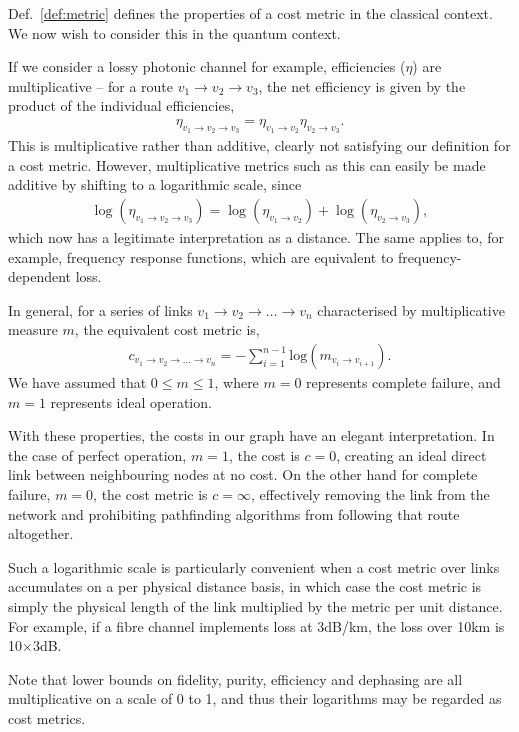 \documentclass[aps, rmp, twocolumn, amsmath, amssymb, nofootinbib, superscriptaddress, longbibliography, floatfix, table-of-contents, eqsecnum]{revtex4-1}
\begin{document}
Def.~\ref{def:metric} defines the properties of a cost metric in the classical context. We now wish to consider this in the quantum context.

If we consider a lossy photonic channel for example, efficiencies ($\eta$) are multiplicative -- for a route \mbox{$v_1\to v_2\to v_3$}, the net efficiency is given by the product of the individual efficiencies, \begin{align}
\eta_{v_1\to v_2 \to v_3} = \eta_{v_1\to v_2} \eta_{v_2\to v_3}.
\end{align}
This is multiplicative rather than additive, clearly not satisfying our definition for a cost metric. However, multiplicative metrics such as this can easily be made additive by shifting to a logarithmic scale, since
\begin{align}
\log(\eta_{v_1\to v_2\to v_3}) = \log(\eta_{v_1\to v_2}) + \log(\eta_{v_2\to v_3}),
\end{align}
which now has a legitimate interpretation as a distance. The same applies to, for example, frequency response functions, which are equivalent to frequency-dependent loss.

In general, for a series of links \mbox{$v_1\to v_2 \to \dots \to v_n$} characterised by multiplicative measure $m$, the equivalent cost metric is,
\begin{align} \label{eq:dist_log}
c_{v_1\to v_2 \to \dots \to v_n} = -\sum_{i=1}^{n-1} \text{log}(m_{v_i\to v_{i+1}}).
\end{align}
We have assumed that \mbox{$0\leq m \leq 1$}, where \mbox{$m=0$} represents complete failure, and \mbox{$m=1$} represents ideal operation.

With these properties, the costs in our graph have an elegant interpretation. In the case of perfect operation, \mbox{$m=1$}, the cost is \mbox{$c=0$}, creating an ideal direct link between neighbouring nodes at no cost. On the other hand for complete failure, \mbox{$m=0$}, the cost metric is \mbox{$c=\infty$}, effectively removing the link from the network and prohibiting pathfinding algorithms from following that route altogether.

Such a logarithmic scale is particularly convenient when a cost metric over links accumulates on a per physical distance basis, in which case the cost metric is simply the physical length of the link multiplied by the metric per unit distance. For example, if a fibre channel implements loss at 3dB/km, the loss over 10km is 10$\times$3dB.

Note that lower bounds on fidelity, purity, efficiency and dephasing are all multiplicative on a scale of 0 to 1, and thus their logarithms may be regarded as cost metrics.
\end{document}
